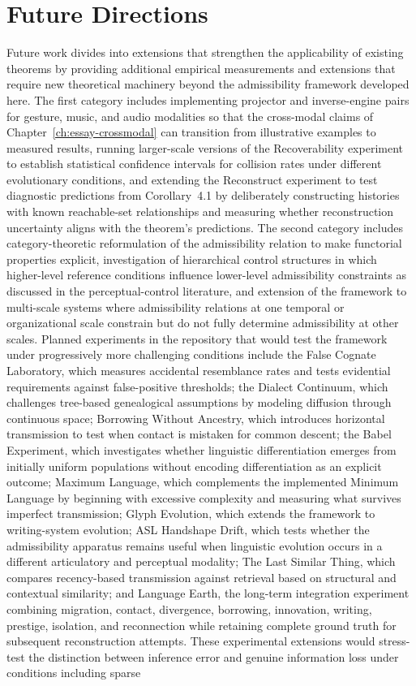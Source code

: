 \chapter{Future Directions}
\label{ch:essay-future}

Future work divides into extensions that strengthen the applicability of existing theorems by providing additional empirical measurements and extensions that require new theoretical machinery beyond the admissibility framework developed here. The first category includes implementing projector and inverse-engine pairs for gesture, music, and audio modalities so that the cross-modal claims of Chapter~\ref{ch:essay-crossmodal} can transition from illustrative examples to measured results, running larger-scale versions of the Recoverability experiment to establish statistical confidence intervals for collision rates under different evolutionary conditions, and extending the Reconstruct experiment to test diagnostic predictions from Corollary~4.1 by deliberately constructing histories with known reachable-set relationships and measuring whether reconstruction uncertainty aligns with the theorem's predictions. The second category includes category-theoretic reformulation of the admissibility relation to make functorial properties explicit, investigation of hierarchical control structures in which higher-level reference conditions influence lower-level admissibility constraints as discussed in the perceptual-control literature, and extension of the framework to multi-scale systems where admissibility relations at one temporal or organizational scale constrain but do not fully determine admissibility at other scales. Planned experiments in the repository that would test the framework under progressively more challenging conditions include the False Cognate Laboratory, which measures accidental resemblance rates and tests evidential requirements against false-positive thresholds; the Dialect Continuum, which challenges tree-based genealogical assumptions by modeling diffusion through continuous space; Borrowing Without Ancestry, which introduces horizontal transmission to test when contact is mistaken for common descent; the Babel Experiment, which investigates whether linguistic differentiation emerges from initially uniform populations without encoding differentiation as an explicit outcome; Maximum Language, which complements the implemented Minimum Language by beginning with excessive complexity and measuring what survives imperfect transmission; Glyph Evolution, which extends the framework to writing-system evolution; ASL Handshape Drift, which tests whether the admissibility apparatus remains useful when linguistic evolution occurs in a different articulatory and perceptual modality; The Last Similar Thing, which compares recency-based transmission against retrieval based on structural and contextual similarity; and Language Earth, the long-term integration experiment combining migration, contact, divergence, borrowing, innovation, writing, prestige, isolation, and reconnection while retaining complete ground truth for subsequent reconstruction attempts. These experimental extensions would stress-test the distinction between inference error and genuine information loss under conditions including sparse 